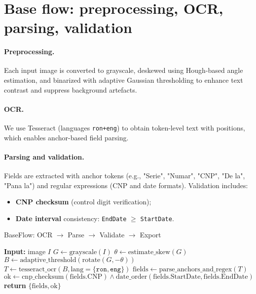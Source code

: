 \documentclass[runningheads,a4paper,11pt]{report}
\begin{document}
\section*{Base flow: preprocessing, OCR, parsing, validation}
\paragraph{Preprocessing.} Each input image is converted to grayscale, deskewed using Hough-based angle estimation, and binarized with adaptive Gaussian thresholding to enhance text contrast and suppress background artefacts.

\paragraph{OCR.} We use Tesseract (languages \texttt{ron+eng}) to obtain token-level text with positions, which enables anchor-based field parsing.

\paragraph{Parsing and validation.} Fields are extracted with anchor tokens (e.g., "Serie", "Numar", "CNP", "De la", "Pana la") and regular expressions (CNP and date formats). Validation includes:
\begin{itemize}
  \item \textbf{CNP checksum} (control digit verification);
  \item \textbf{Date interval} consistency: \texttt{EndDate} $\geq$ \texttt{StartDate}.
\end{itemize}

\begin{algorithm}[H]
\caption{BaseFlow: OCR $\rightarrow$ Parse $\rightarrow$ Validate $\rightarrow$ Export}
\label{alg:baseflow}
\begin{algorithmic}
  \STATE \textbf{Input:} image $I$
  \STATE $G \leftarrow \text{grayscale}(I)$
  \STATE $\theta \leftarrow \text{estimate\_skew}(G)$
  \STATE $B \leftarrow \text{adaptive\_threshold}(\text{rotate}(G,-\theta))$
  \STATE $T \leftarrow \text{tesseract\_ocr}(B,\text{lang}=\{\texttt{ron},\texttt{eng}\})$
  \STATE $\text{fields} \leftarrow \text{parse\_anchors\_and\_regex}(T)$
  \STATE $\text{ok} \leftarrow \text{cnp\_checksum}(\text{fields.CNP}) \wedge \text{date\_order}(\text{fields.StartDate},\text{fields.EndDate})$
  \STATE \textbf{return} $\{\text{fields}, \text{ok}\}$
\end{algorithmic}
\end{algorithm}
\end{document}
